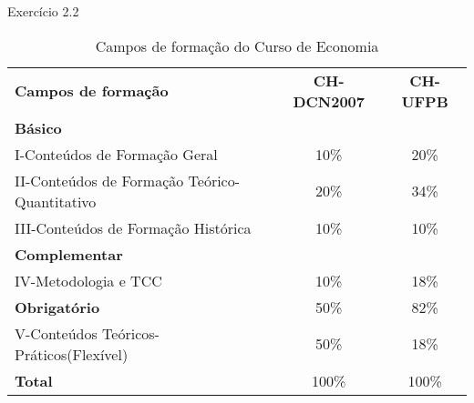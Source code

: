 \documentclass[12pt,a4paper]{article}
\begin{document}
	
	
Exercício 2.2

\begin{table}[H]
	\caption{Campos de formação do Curso de Economia}
	\centering
	\begin{tabular}{ l | c c }
		\hline
		\textbf{Campos de formação} & \textbf{CH-DCN2007} & \textbf{CH-UFPB} \\ \cline{2-3} 
		
		\textbf{Básico}\\  
		I-Conteúdos de Formação Geral 					& 10\% &20\% \\
		II-Conteúdos de Formação Teórico-Quantitativo 	& 20\% & 34\% \\
		III-Conteúdos de Formação Histórica 			& 10\% & 10\% \\
		
		\textbf{Complementar}\\  
		IV-Metodologia e TCC 							& 10\% & 18\% \\
		
		\textbf{Obrigatório} 							& 50\% & 82\% \\ 
		V-Conteúdos Teóricos-Práticos(Flexível)			& 50\% & 18\% \\ \hline
		
		\textbf{Total} 									& 100\% & 100\% \\ \hline
	\end{tabular}
\end{table}

	
\end{document}
